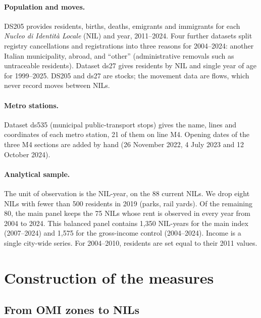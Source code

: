 \paragraph{Population and moves.} DS205 provides residents, births, deaths,
emigrants and immigrants for each \emph{Nucleo di Identit\`a Locale} (NIL) and
year, 2011--2024. Four further datasets split registry cancellations and
registrations into three reasons for 2004--2024: another Italian
municipality, abroad, and ``other'' (administrative removals such as
untraceable residents). Dataset ds27 gives residents by NIL and single year of
age for 1999--2025. DS205 and ds27 are stocks; the movement data are flows,
which never record moves between NILs.

\paragraph{Metro stations.} Dataset ds535 (municipal public-transport stops)
gives the name, lines and coordinates of each metro station, 21 of them on
line M4. Opening dates of the three M4 sections are added by hand
(26 November 2022, 4 July 2023 and 12 October 2024).

\paragraph{Analytical sample.} The unit of observation is the NIL-year, on the
88 current NILs. We drop eight NILs with fewer than 500 residents in 2019
(parks, rail yards). Of the remaining 80, the main panel keeps the 75 NILs
whose rent is observed in every year from 2004 to 2024. This balanced panel
contains 1,350 NIL-years for the main index (2007--2024) and 1,575 for the
gross-income control (2004--2024). Income is a single city-wide series. For
2004--2010, residents are set equal to their 2011 values.

\section{Construction of the measures}\label{sec:measures}

\subsection{From OMI zones to NILs}\label{sec:xwalk}

